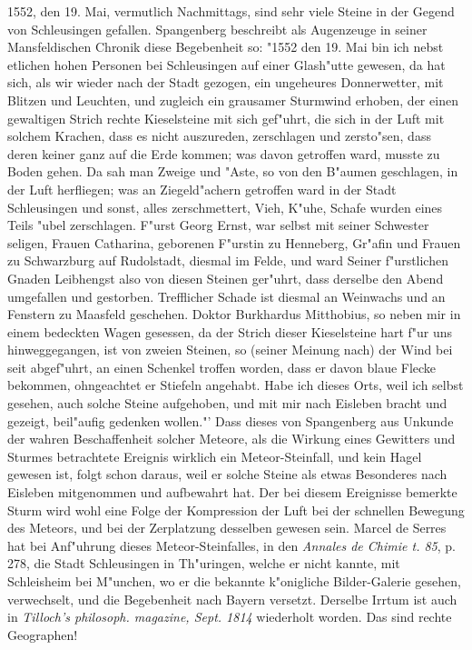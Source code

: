 \documentclass[a4paper, 11pt, oneside, polutonikogreek, german]{article}
\begin{document}
1552, den 19. Mai, vermutlich Nachmittags, sind sehr viele Steine in der Gegend von Schleusingen gefallen. Spangenberg beschreibt als Augenzeuge in seiner Mansfeldischen Chronik diese Begebenheit so: "1552 den 19. Mai bin ich nebst etlichen hohen Personen bei Schleusingen auf einer Glash"utte gewesen, da hat sich, als wir wieder nach der Stadt gezogen, ein ungeheures Donnerwetter, mit Blitzen und Leuchten, und zugleich ein grausamer Sturmwind erhoben, der einen gewaltigen Strich rechte Kieselsteine mit sich gef"uhrt, die sich in der Luft mit solchem Krachen, dass es nicht auszureden, zerschlagen und zersto"sen, dass deren keiner ganz auf die Erde kommen; was davon getroffen ward, musste zu Boden gehen. Da sah man Zweige und "Aste, so von den B"aumen geschlagen, in der Luft herfliegen; was an Ziegeld"achern getroffen ward in der Stadt Schleusingen und sonst, alles zerschmettert, Vieh, K"uhe, Schafe wurden eines Teils "ubel zerschlagen. F"urst Georg Ernst, war selbst mit seiner Schwester seligen, Frauen Catharina, geborenen F"urstin zu Henneberg, Gr"afin und Frauen zu Schwarzburg auf Rudolstadt, diesmal im Felde, und ward Seiner f"urstlichen Gnaden Leibhengst also von diesen Steinen ger"uhrt, dass derselbe den Abend umgefallen und gestorben. Trefflicher Schade ist diesmal an Weinwachs und an Fenstern zu Maasfeld geschehen. Doktor Burkhardus Mitthobius, so neben mir in einem bedeckten Wagen gesessen, da der Strich dieser Kieselsteine hart f"ur uns hinweggegangen, ist von zweien Steinen, so (seiner Meinung nach) der Wind bei seit abgef"uhrt, an einen Schenkel troffen worden, dass er davon blaue Flecke bekommen, ohngeachtet er Stiefeln angehabt. Habe ich dieses Orts, weil ich selbst gesehen, auch solche Steine aufgehoben, und mit mir nach Eisleben bracht und gezeigt, beil"aufig gedenken wollen."' Dass dieses von Spangenberg aus Unkunde der wahren Beschaffenheit solcher Meteore, als die Wirkung eines Gewitters und Sturmes betrachtete Ereignis wirklich ein Meteor-Steinfall, und kein Hagel gewesen ist, folgt schon daraus, weil er solche Steine als etwas Besonderes nach Eisleben mitgenommen und aufbewahrt hat. Der bei diesem Ereignisse bemerkte Sturm wird wohl eine Folge der Kompression der Luft bei der schnellen Bewegung des Meteors, und bei der Zerplatzung desselben gewesen sein. Marcel de Serres hat bei Anf"uhrung dieses Meteor-Steinfalles, in den \emph{Annales de Chimie t. 85}, p. 278, die Stadt Schleusingen in Th"uringen, welche er nicht kannte, mit Schleisheim bei M"unchen, wo er die bekannte k"onigliche Bilder-Galerie gesehen, verwechselt, und die Begebenheit nach Bayern versetzt. Derselbe Irrtum ist auch in \emph{Tilloch's philosoph. magazine, Sept. 1814} wiederholt worden. Das sind rechte Geographen!
\end{document}

